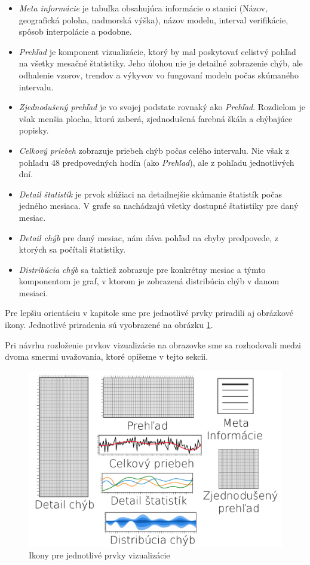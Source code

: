 \begin{itemize}
	\item\textit{Meta informácie} je tabuľka obsahujúca informácie o stanici (Názov, geografická poloha, nadmorská výška), názov modelu, interval verifikácie, spôsob interpolácie a podobne.  
		
	\item\textit{Prehľad} je komponent vizualizácie, ktorý by mal poskytovať celistvý pohľad na všetky mesačné štatistiky. Jeho úlohou nie je detailné zobrazenie chýb, ale odhalenie vzorov, trendov a výkyvov vo fungovaní modelu počas skúmaného intervalu.
	
	\item\textit{Zjednodušený prehľad} je vo svojej podstate rovnaký ako \textit{Prehľad}. Rozdielom je však menšia plocha, ktorú zaberá, zjednodušená farebná škála a chýbajúce popisky.
	
	\item\textit{Celkový priebeh} zobrazuje priebeh chýb počas celého intervalu. Nie však z pohľadu 48 predpovedných hodín (ako \textit{Prehľad}), ale z pohľadu jednotlivých dní.
	
	\item\textit{Detail štatistík} je prvok slúžiaci na detailnejšie skúmanie štatistík počas jedného mesiaca. V grafe sa nachádzajú všetky dostupné štatistiky pre daný mesiac.
	
	\item\textit{Detail chýb} pre daný mesiac, nám dáva pohľad na chyby predpovede, z ktorých sa počítali štatistiky.
	
	\item\textit{Distribúcia chýb} sa taktiež zobrazuje pre konkrétny mesiac a týmto komponentom je graf, v ktorom je zobrazená distribúcia chýb v danom mesiaci.
\end{itemize}

 Pre lepšiu orientáciu v kapitole sme pre jednotlivé prvky priradili aj obrázkové ikony. Jednotlivé priradenia sú vyobrazené na obrázku \ref{fig:designicons}. 
 
 Pri návrhu rozloženie prvkov vizualizácie na obrazovke sme sa rozhodovali medzi dvoma smermi uvažovania, ktoré opíšeme v tejto sekcii. 

\begin{figure}
	\centering
	\includegraphics[width = 4.5in]{designicons}
	\caption{Ikony pre jednotlivé prvky vizualizácie}
	\label{fig:designicons}
\end{figure}


